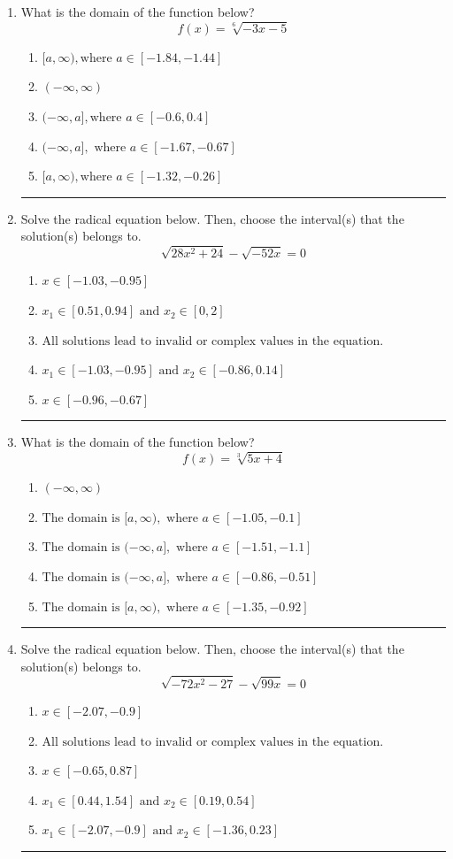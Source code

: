 \documentclass[14pt]{extbook}
\newcommand{\litem}[1]{\item#1\hspace*{-1cm}\rule{\textwidth}{0.4pt}}
\begin{document}
\begin{enumerate}
{\begin{enumerate}[label=\Alph*.]
\end{enumerate} }
\litem{
What is the domain of the function below?\[ f(x) = \sqrt[6]{-3 x - 5} \]\begin{enumerate}[label=\Alph*.]
\item \( [a, \infty), \text{where } a \in [-1.84, -1.44] \)
\item \( (-\infty, \infty) \)
\item \( (-\infty, a], \text{where } a \in [-0.6, 0.4] \)
\item \( (-\infty, a], \text{ where } a \in [-1.67, -0.67] \)
\item \( [a, \infty), \text{where } a \in [-1.32, -0.26] \)

\end{enumerate} }
\litem{
Solve the radical equation below. Then, choose the interval(s) that the solution(s) belongs to.\[ \sqrt{28 x^2 + 24} - \sqrt{-52 x} = 0 \]\begin{enumerate}[label=\Alph*.]
\item \( x \in [-1.03,-0.95] \)
\item \( x_1 \in [0.51, 0.94] \text{ and } x_2 \in [0,2] \)
\item \( \text{All solutions lead to invalid or complex values in the equation.} \)
\item \( x_1 \in [-1.03, -0.95] \text{ and } x_2 \in [-0.86,0.14] \)
\item \( x \in [-0.96,-0.67] \)

\end{enumerate} }
\litem{
What is the domain of the function below?\[ f(x) = \sqrt[3]{5 x + 4} \]\begin{enumerate}[label=\Alph*.]
\item \( (-\infty, \infty) \)
\item \( \text{The domain is } [a, \infty), \text{   where } a \in [-1.05, -0.1] \)
\item \( \text{The domain is } (-\infty, a], \text{   where } a \in [-1.51, -1.1] \)
\item \( \text{The domain is } (-\infty, a], \text{   where } a \in [-0.86, -0.51] \)
\item \( \text{The domain is } [a, \infty), \text{   where } a \in [-1.35, -0.92] \)

\end{enumerate} }
\litem{
Solve the radical equation below. Then, choose the interval(s) that the solution(s) belongs to.\[ \sqrt{-72 x^2 - 27} - \sqrt{99 x} = 0 \]\begin{enumerate}[label=\Alph*.]
\item \( x \in [-2.07,-0.9] \)
\item \( \text{All solutions lead to invalid or complex values in the equation.} \)
\item \( x \in [-0.65,0.87] \)
\item \( x_1 \in [0.44, 1.54] \text{ and } x_2 \in [0.19,0.54] \)
\item \( x_1 \in [-2.07, -0.9] \text{ and } x_2 \in [-1.36,0.23] \)


\end{enumerate}}
\end{enumerate}
\end{document}
